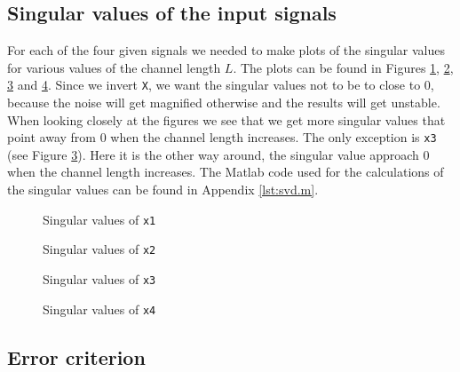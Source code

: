 \documentclass[final]{scrreprt} %
\begin{document}
\subsection{Singular values of the input signals}
For each of the four given signals we needed to make plots of the singular values for various values of the channel length $L$. 
The plots can be found in Figures \ref{fig:svd1}, \ref{fig:svd2}, \ref{fig:svd3} and \ref{fig:svd4}. 
Since we invert \texttt{X}, we want the singular values not to be to close to 0, because the noise will get magnified otherwise and the results will get unstable. 
\\
When looking closely at the figures we see that we get more singular values that point away from 0 when the channel length increases. 
The only exception is \texttt{x3} (see Figure \ref{fig:svd3}).
Here it is the other way around, the singular value approach 0 when the channel length increases. 
The Matlab code used for the calculations of the singular values can be found in Appendix \ref{lst:svd.m}.



\begin{figure}[H]
	\centering
    	\setlength\figureheight{6cm}
    	\setlength\figurewidth{10cm}
    	    	
    	\caption{Singular values of \texttt{x1}}
    	\label{fig:svd1}
\end{figure}

\begin{figure}[H]
	\centering
    	\setlength\figureheight{6cm}
    	\setlength\figurewidth{10cm}
    	    	
    	\caption{Singular values of \texttt{x2}}
    	\label{fig:svd2}
\end{figure}

\begin{figure}[H]
	\centering
    	\setlength\figureheight{6cm}
    	\setlength\figurewidth{10cm}
    	    	
    	\caption{Singular values of \texttt{x3}}
    	\label{fig:svd3}
\end{figure}

\begin{figure}[H]
	\centering
    	\setlength\figureheight{6cm}
    	\setlength\figurewidth{10cm}
    	    	
    	\caption{Singular values of \texttt{x4}}
    	\label{fig:svd4}
\end{figure}

\subsection{Error criterion}
\end{document}
